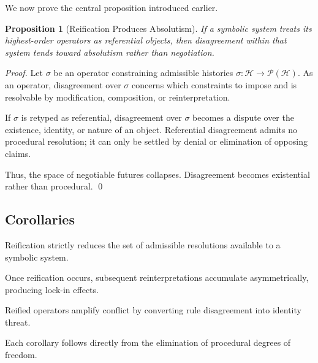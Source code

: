 \documentclass[11pt]{article}
\newtheorem{proposition}{Proposition}
\newcommand{\Hist}{\mathcal{H}}
\begin{document}
We now prove the central proposition introduced earlier.

\begin{proposition}[Reification Produces Absolutism]
If a symbolic system treats its highest-order operators as referential objects,
then disagreement within that system tends toward absolutism rather than
negotiation.
\end{proposition}

\begin{proof}
Let $\sigma$ be an operator constraining admissible histories
$\sigma : \Hist \to \mathcal{P}(\Hist)$. As an operator, disagreement over $\sigma$
concerns which constraints to impose and is resolvable by modification,
composition, or reinterpretation.

If $\sigma$ is retyped as referential, disagreement over $\sigma$ becomes a
dispute over the existence, identity, or nature of an object. Referential
disagreement admits no procedural resolution; it can only be settled by denial
or elimination of opposing claims.

Thus, the space of negotiable futures collapses. Disagreement becomes existential
rather than procedural. \qed
\end{proof}

\subsection{Corollaries}

\begin{corollary}
Reification strictly reduces the set of admissible resolutions available to a
symbolic system.
\end{corollary}

\begin{corollary}
Once reification occurs, subsequent reinterpretations accumulate asymmetrically,
producing lock-in effects.
\end{corollary}

\begin{corollary}
Reified operators amplify conflict by converting rule disagreement into identity
threat.
\end{corollary}

Each corollary follows directly from the elimination of procedural degrees of
freedom.
\end{document}
